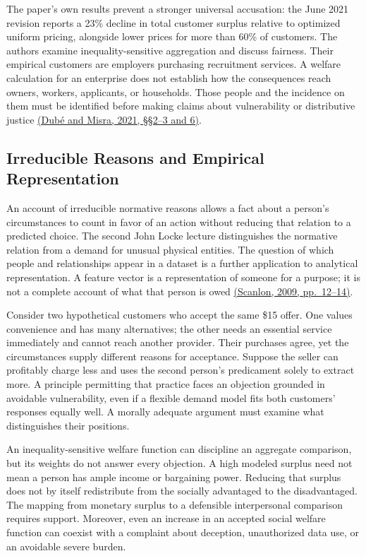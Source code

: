 The paper's own results prevent a stronger universal accusation: the
June 2021 revision reports a 23\% decline in total customer surplus
relative to optimized uniform pricing, alongside lower prices for more
than 60\% of customers. The authors examine inequality-sensitive
aggregation and discuss fairness. Their empirical customers are
employers purchasing recruitment services. A welfare calculation for an
enterprise does not establish how the consequences reach owners,
workers, applicants, or households. Those people and the incidence on
them must be identified before making claims about vulnerability or
distributive justice \href{https://www.nber.org/papers/w23775}{(Dubé and
Misra, 2021, §§2--3 and 6)}.

\hypertarget{M09-irreducible-reasons-and-empirical-representation}{%
\subsection{Irreducible Reasons and Empirical
Representation}\label{M09-irreducible-reasons-and-empirical-representation}}

\noindent \noindent An account of irreducible normative reasons allows a fact
about a person's circumstances to count in favor of an action without
reducing that relation to a predicted choice. The second John Locke
lecture distinguishes the normative relation from a demand for unusual
physical entities. The question of which people and relationships appear
in a dataset is a further application to analytical representation. A
feature vector is a representation of someone for a purpose; it is not a
complete account of what that person is owed
\href{https://media.philosophy.ox.ac.uk/assets/pdf_file/0008/25856/Lecture_2.pdf}{(Scanlon,
2009, pp.~12--14)}.

Consider two hypothetical customers who accept the same \$15 offer. One
values convenience and has many alternatives; the other needs an
essential service immediately and cannot reach another provider. Their
purchases agree, yet the circumstances supply different reasons for
acceptance. Suppose the seller can profitably charge less and uses the
second person's predicament solely to extract more. A principle
permitting that practice faces an objection grounded in avoidable
vulnerability, even if a flexible demand model fits both customers'
responses equally well. A morally adequate argument must examine what
distinguishes their positions.

An inequality-sensitive welfare function can discipline an aggregate
comparison, but its weights do not answer every objection. A high
modeled surplus need not mean a person has ample income or bargaining
power. Reducing that surplus does not by itself redistribute from the
socially advantaged to the disadvantaged. The mapping from monetary
surplus to a defensible interpersonal comparison requires support.
Moreover, even an increase in an accepted social welfare function can
coexist with a complaint about deception, unauthorized data use, or an
avoidable severe burden.


